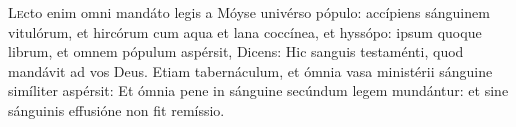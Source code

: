 
\lettrine{L}{e}cto enim omni mandáto legis a Móyse univérso pópulo: accípiens sánguinem vitulórum, et hircórum cum aqua et lana coccínea, et hyssópo: i\-psum quoque librum, et o\-mnem pópulum aspérsit, 
Dicens: Hic sanguis testaménti, quod mandávit ad vos Deus. 
Etiam tabernáculum, et ó\-mnia vasa ministérii sánguine simíliter aspérsit: 
Et ó\-mnia pene in sánguine secúndum legem mundántur: et sine sánguinis effusióne non fit remíssio.